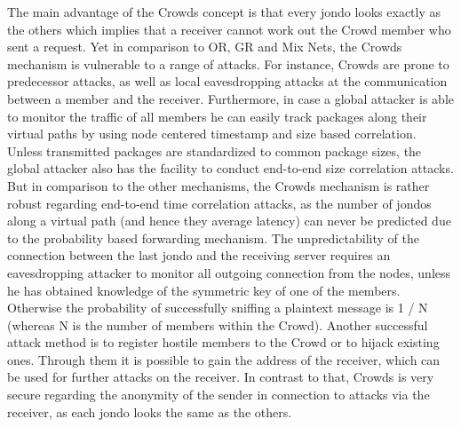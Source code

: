 \documentclass{sig-alternate}
\begin{document}
The main advantage of the Crowds concept is that every jondo looks exactly as the others which implies that a receiver cannot work out the Crowd member who sent a request. Yet in comparison to OR, GR and Mix Nets, the Crowds mechanism is vulnerable to a range of attacks. For instance, Crowds are prone to predecessor attacks, as well as local eavesdropping attacks at the communication between a member and the receiver. Furthermore, in case a global attacker is able to monitor the traffic of all members he can easily track packages along their virtual paths by using node centered timestamp and size based correlation. Unless transmitted packages are standardized to common package sizes, the global attacker also has the facility to conduct end-to-end size correlation attacks. But in comparison to the other mechanisms, the Crowds mechanism is rather robust regarding end-to-end time correlation attacks, as the number of jondos along a virtual path (and hence they average latency) can never be predicted due to the probability based forwarding mechanism. The unpredictability of the connection between the last jondo and the receiving server requires an eavesdropping attacker to monitor all outgoing connection from the nodes, unless he has obtained knowledge of the symmetric key of one of the members. Otherwise the probability of successfully sniffing a plaintext message is 1 / N (whereas N is the number of members within the Crowd). Another successful attack method is to register hostile members to the Crowd or to hijack existing ones. Through them it is possible to gain the address of the receiver, which can be used for further attacks on the receiver. In contrast to that, Crowds is very secure regarding the anonymity of the sender in connection to attacks via the receiver, as each jondo looks the same as the others. 
\end{document}
